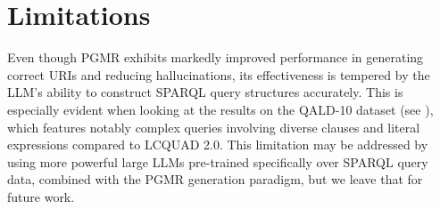 \section*{Limitations}

Even though PGMR exhibits markedly improved performance in generating correct URIs and reducing hallucinations, its effectiveness is tempered by the LLM's ability to construct SPARQL query structures accurately.
This is especially evident when looking at the results on the QALD-10 dataset (see ), which features notably complex queries involving diverse clauses and literal expressions compared to LCQUAD 2.0.
This limitation may be addressed by using more powerful large LLMs pre-trained specifically over SPARQL query data, combined with the PGMR generation paradigm, but we leave that for future work.